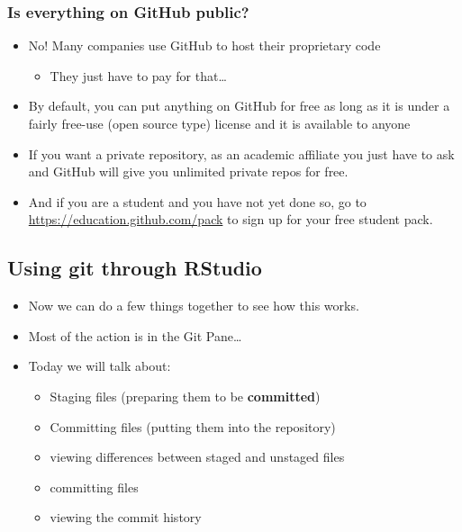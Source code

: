\documentclass[]{book}
\providecommand{\tightlist}{%
  \setlength{\itemsep}{0pt}\setlength{\parskip}{0pt}}
\theoremstyle{definition}
\theoremstyle{definition}
\theoremstyle{remark}
\begin{document}
\subsubsection{Is everything on GitHub
public?}\label{is-everything-on-github-public}

\begin{itemize}
\tightlist
\item
  No! Many companies use GitHub to host their proprietary code

  \begin{itemize}
  \tightlist
  \item
    They just have to pay for that\ldots{}
  \end{itemize}
\item
  By default, you can put anything on GitHub for free as long as it is
  under a fairly free-use (open source type) license and it is available
  to anyone
\item
  If you want a private repository, as an academic affiliate you just
  have to ask and GitHub will give you unlimited private repos for free.
\item
  And if you are a student and you have not yet done so, go to
  \url{https://education.github.com/pack} to sign up for your free
  student pack.
\end{itemize}

\subsection{Using git through RStudio}\label{git-thru-rstudio}

\begin{itemize}
\tightlist
\item
  Now we can do a few things together to see how this works.
\item
  Most of the action is in the Git Pane\ldots{}
\item
  Today we will talk about:

  \begin{itemize}
  \tightlist
  \item
    Staging files (preparing them to be \textbf{committed})
  \item
    Committing files (putting them into the repository)
  \item
    viewing differences between staged and unstaged files
  \item
    committing files
  \item
    viewing the commit history
  \end{itemize}
\end{itemize}
\end{document}
